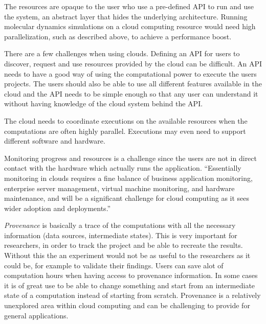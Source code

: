 The resources are opaque to the user who use a pre-defined API to run
and use the system, an abstract layer that hides the underlying
architecture. Running molecular dynamics simulations on a cloud
computing resource would need high parallelization, such as described
above, to achieve a performance boost.

There are a few challenges when using clouds. Defining an API for
users to discover, request and use resources provided by the cloud can
be difficult. An API needs to have a good way of using the
computational power to execute the users projects. The users should
also be able to use all different features available in the cloud and
the API needs to be simple enough so that any user can understand it
without having knowledge of the cloud system behind the API.

The cloud needs to coordinate executions on the available resources
when the computations are often highly parallel. Executions may even
need to support different software and hardware.



Monitoring progress and resources is a challenge since the users are
not in direct contact with the hardware which actually runs the
application. ``Essentially monitoring in clouds requires a fine
balance of business application monitoring, enterprise server
management, virtual machine monitoring, and hardware maintenance, and
will be a significant challenge for cloud computing as it sees wider
adoption and deployments.'' \citep{foster:2008}



\emph{Provenance} is basically a trace of the computations with all
the necessary information (data sources, intermediate states). This is
very important for researchers, in order to track the project and be
able to recreate the results. Without this the an experiment would not
be as useful to the researchers as it could be, for example to
validate their findings. Users can save alot of computation hours when
having access to provenance information. In some cases it is of great
use to be able to change something and start from an intermediate
state of a computation instead of starting from scratch. Provenance is
a relatively unexplored area within cloud computing and can be
challenging to provide for general applications.

